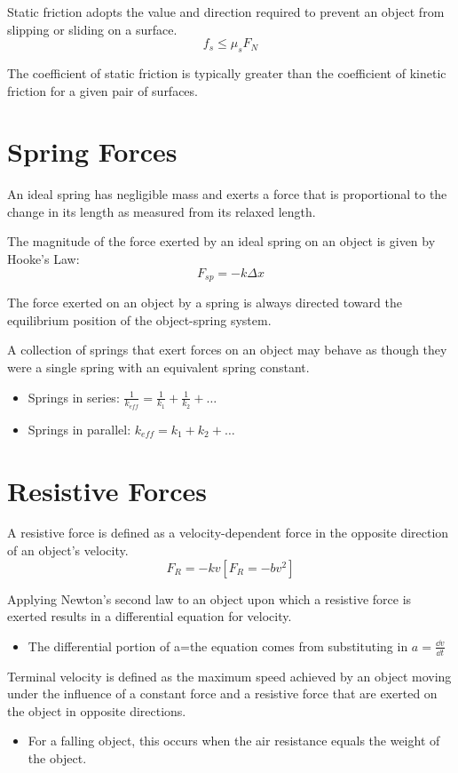 \documentclass[../mech.tex]{subfiles}
\begin{document}
Static friction adopts the value and direction required to prevent an object from slipping or sliding on a surface.
\[ f_s \leq \mu_s F_N \]

The coefficient of static friction is typically greater than the coefficient of kinetic friction for a given pair of surfaces.
\section{Spring Forces}
An ideal spring has negligible mass and exerts a force that is proportional to the change in its length as measured from its relaxed length.

The magnitude of the force exerted by an ideal spring on an object is given by Hooke's Law:
\[ F_{sp}=-k\Delta x \] 

The force exerted on an object by a spring is always directed toward the equilibrium position of the object-spring system.

A collection of springs that exert forces on an object may behave as though they were a single spring with an equivalent spring constant.
\begin{itemize}
    \item Springs in series: $\frac{1}{k_{eff}}=\frac{1}{k_1}+\frac{1}{k_2}+\dots$
    \item Springs in parallel: $k_{eff}=k_1+k_2+\dots$
\end{itemize}
\section{Resistive Forces}
A resistive force is defined as a velocity-dependent force in the opposite direction of an object's velocity.
\[ F_R=-kv [F_R=-bv^2] \]

Applying Newton's second law to an object upon which a resistive force is exerted results in a differential equation for velocity.
\begin{itemize}
    \item The differential portion of a=the equation comes from substituting in $a=\frac{\dd v}{\dd t}$
\end{itemize}

Terminal velocity is defined as the maximum speed achieved by an object moving under the influence of a constant force and a resistive force that are exerted on the object in opposite directions.
\begin{itemize}
    \item For a falling object, this occurs when the air resistance equals the weight of the object.
\end{itemize}
\end{document}
